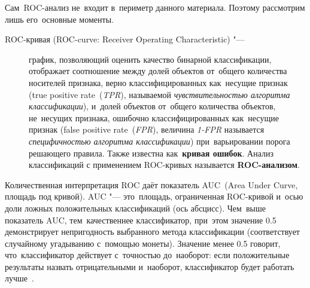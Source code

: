 \documentclass[]{scrreprt}
\begin{document}
Сам~ROC-анализ не~входит в~периметр данного материала. Поэтому рассмотрим лишь его~основные моменты.
\begin{description}
	\item[ROC-кривая \foreignlanguage{english}{(ROC-curve: Receiver Operating Characteristic)} "---] график, позволяющий оценить качество бинарной классификации, отображает соотношение между долей объектов от~общего количества носителей признака, верно классифицированных как~несущие признак (\foreignlanguage{english}{true positive rate~(\emph{TPR})}, называемой \emph{чувствительностью алгоритма классификации}), и~долей объектов от~общего количества объектов, не~несущих признака, ошибочно классифицированных как~несущие признак (\foreignlanguage{english}{false positive rate~(\emph{FPR})}, величина \emph{1-FPR} называется \emph{специфичностью алгоритма классификации}) при~варьировании порога решающего правила. Также известна как~\textbf{кривая ошибок}. Анализ классификаций с применением ROC-кривых называется \textbf{ROC-анализом}. 
\end{description}
Количественная интерпретация ROC даёт показатель AUC~(\foreignlanguage{english}{Area Under Curve}, площадь под кривой). AUC "--- это~площадь, ограниченная ROC-кривой и~осью доли ложных положительных классификаций (ось абсцисс). Чем~выше показатель AUC, тем~качественнее классификатор, при~этом значение 0.5 демонстрирует непригодность выбранного метода классификации (соответствует случайному угадыванию с~помощью монеты). Значение менее 0.5 говорит, что~классификатор действует с~точностью до~наоборот: если положительные результаты назвать отрицательными и~наоборот, классификатор будет работать лучше~\cite{Wiki:ROC}.
\end{document}
